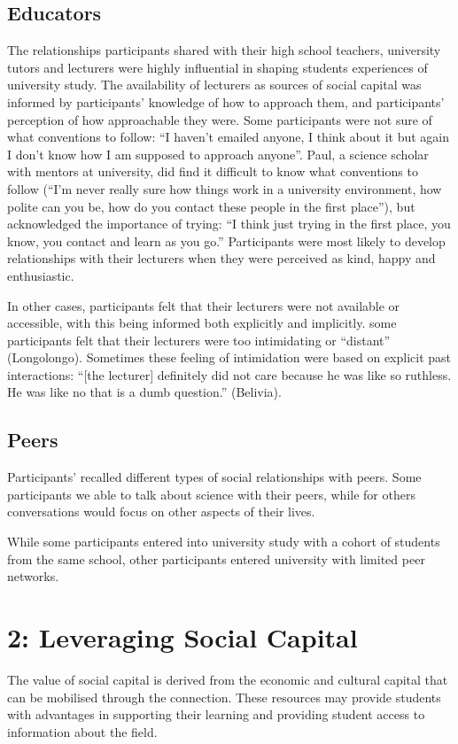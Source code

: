 \subsection{Educators}
The relationships participants shared with their high school teachers, university tutors and lecturers were highly influential in shaping students experiences of university study. The availability of lecturers as sources of social capital was informed by participants' knowledge of how to approach them, and participants' perception of how approachable they were. Some participants were not sure of what conventions to follow: ``I haven't emailed anyone, I think about it but again I don’t know how I am supposed to approach anyone''. Paul, a science scholar with mentors at university, did find it difficult to know what conventions to follow (``I'm never really sure how things work in a university environment, how polite can you be, how do you contact these people in the first place''), but acknowledged the importance of trying: ``I think just trying in the first place, you know, you contact and learn as you go.'' 
Participants were most likely to develop relationships with their lecturers when they were perceived as kind, happy and enthusiastic. 

In other cases, participants felt that their lecturers were not available or accessible, with this being informed both explicitly and implicitly. some participants felt that their lecturers were too intimidating or ``distant'' (Longolongo). Sometimes these feeling of intimidation were based on explicit past interactions: ``[the lecturer] definitely did not care because he was like so ruthless. He was like no that is a dumb question.'' (Belivia).



\subsection{Peers}
Participants' recalled different types of social relationships with peers. Some participants we able to talk about science with their peers, while for others conversations would focus on other aspects of their lives. 

While some participants entered into university study with a cohort of students from the same school, other participants entered university with limited peer networks.  


\section{2: Leveraging Social Capital}
The value of social capital is derived from the economic and cultural capital that can be mobilised through the connection. These resources may provide students with advantages in supporting their learning and providing student access to information about the field. 

